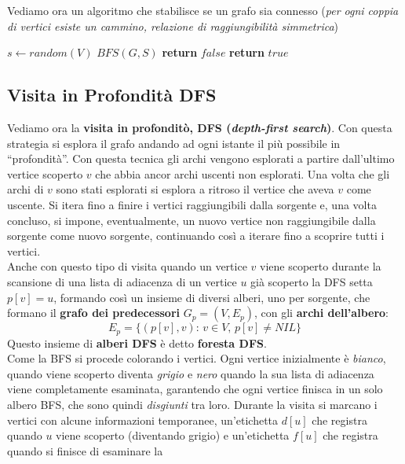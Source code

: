 \documentclass[a4paper,12pt, oneside]{book}
\begin{document}
Vediamo ora un algoritmo che stabilisce se un grafo sia connesso
(\textit{per ogni coppia di vertici esiste un cammino, relazione di
  raggiungibilità simmetrica})
\begin{algorithm}[H]
  \begin{algorithmic}
    \State $s\gets random(V)$
    \State $BFS(G, S)$
    \State \textbf{return }$false$
    \Else
    \State \textbf{return }$true$
    \EndIf
    \EndFor
    \EndFunction
  \end{algorithmic}
\end{algorithm}
\subsection{Visita in Profondità DFS}
Vediamo ora la \textbf{visita in profonditò, DFS (\textit{depth-first
    search})}. Con questa strategia si esplora il grafo andando ad
ogni istante il più possibile in ``profondità''. Con questa tecnica
gli archi vengono esplorati a partire dall'ultimo vertice scoperto $v$
che abbia ancor archi uscenti non esplorati. Una volta che gli archi
di $v$ sono stati esplorati si esplora a ritroso il vertice che aveva
$v$ come uscente. Si itera fino a finire i vertici raggiungibili dalla
sorgente e, una volta concluso, si impone, eventualmente, un nuovo
vertice non raggiungibile dalla sorgente come nuovo sorgente,
continuando così a iterare fino a scoprire tutti i vertici. \\
Anche con questo tipo di visita quando un vertice $v$ viene scoperto
durante la scansione di una lista di adiacenza di un vertice $u$ già
scoperto la DFS setta $p[v]=u$, formando così un insieme di diversi
alberi, uno per sorgente, che formano il \textbf{grafo dei
  predecessori} $G_p=(V,E_p)$, con gli \textbf{archi dell'albero}:
\[E_p=\{(p[v],v):\,v\in V,\, p[v]\neq NIL\}\]
Questo insieme di \textbf{alberi DFS} è detto \textbf{foresta DFS}.\\
Come la BFS si procede colorando i vertici. Ogni vertice inizialmente
è \textit{bianco}, quando viene scoperto diventa \textit{grigio} e
\textit{nero} quando la sua lista di adiacenza viene completamente
esaminata, garantendo che ogni vertice finisca in un solo albero BFS,
che sono quindi \textit{disgiunti} tra loro. Durante la visita si
marcano i vertici con alcune informazioni temporanee, un'etichetta
$d[u]$ che registra quando $u$ viene scoperto (diventando grigio) e
un'etichetta $f[u]$ che registra quando si finisce di esaminare la
\end{document}
